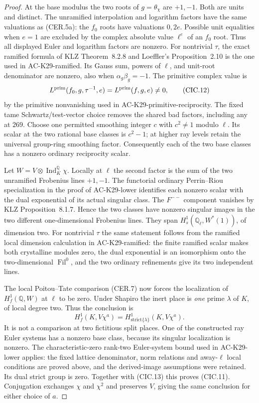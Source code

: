\begin{proof}
At the base modulus the two roots of $g=\theta_\chi$
are $+1,-1$.  Both are units and distinct.  The
unramified interpolation and logarithm factors have
the same valuations as (CER.5a): the $f_0$ roots
have valuations $0,2e$.  Possible unit equalities
when $e=1$ are excluded by the complex absolute
value $\ell^e$ of an $f_0$ root.  Thus all displayed
Euler and logarithm factors are nonzero.
For nontrivial $\tau$, the exact ramified formula
of KLZ Theorem~8.2.8 and Loeffler's Proposition~2.10
is the one used in AC-K29-ramified.  Its Gauss sum,
powers of $\ell$, and unit-root denominator are
nonzero, also when $\alpha_g\beta_g=-1$.
The primitive complex value is
\[
        L^{\rm prim}(f_0,g,\tau^{-1},e)
                    =L^{\rm prim}(f,g,e)\ne0,
                                                        \tag{CIC.12}
\]
by the primitive nonvanishing used in
AC-K29-primitive-reciprocity.  The fixed tame
Schwartz/test-vector choice removes the shared bad
factors, including any at $269$.  Choose one
permitted smoothing integer $c$ with $c^2\ne1$
modulo $\ell$.  Its scalar at the two rational base
classes is $c^2-1$; at higher ray levels retain the
universal group-ring smoothing factor.
Consequently each of the two base classes has a
nonzero ordinary reciprocity scalar.

Let $W=V\otimes\operatorname{Ind}_K^{\mathbb Q}\chi$.
Locally at $\ell$ the second factor is the sum of
the two unramified Frobenius lines $+1,-1$.
The functorial ordinary Perrin--Riou specialization
in the proof of AC-K29-lower identifies each
nonzero scalar with the dual exponential of its
actual singular class.  The $F^{--}$ component
vanishes by KLZ Proposition~8.1.7.  Hence the two
classes have nonzero singular images in the two
different one-dimensional Frobenius lines.  They
span $H_s^1(\mathbb Q_\ell,W^*(1))$, of dimension two.
For nontrivial $\tau$ the same statement follows
from the ramified local dimension calculation in
AC-K29-ramified: the finite ramified scalar makes
both crystalline modules zero, the dual exponential
is an isomorphism onto the two-dimensional
$\operatorname{Fil}^0$, and the two ordinary
refinements give its two independent lines.

The local Poitou--Tate comparison (CER.7) now forces
the localization of $H_f^1(\mathbb Q,W)$ at $\ell$
to be zero.  Under Shapiro the inert place is
\emph{one} prime $\lambda$ of $K$, of local degree
two.  Thus the conclusion is
\[
 H_f^1(K,V\chi^a)
       =H^1_{\mathrm{strict}\{\lambda\}}(K,V\chi^a).
                                                        \tag{CIC.13}
\]
It is not a comparison at two fictitious split places.
One of the constructed ray Euler systems has a
nonzero base class, because its singular localization
is nonzero.  The characteristic-zero rank-two
Euler-system bound used in AC-K29-lower applies:
the fixed lattice denominator, norm relations and
away-$\ell$ local conditions are proved above,
and the derived-image assumptions were retained.
Its dual strict group is zero.  Together with
(CIC.13) this proves (CIC.11).  Conjugation exchanges
$\chi$ and $\chi^2$ and preserves $V$, giving the
same conclusion for either choice of $a$.
\end{proof}

